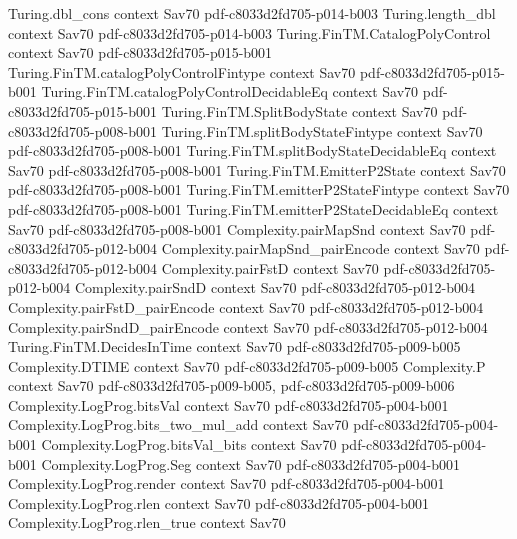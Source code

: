 \begin{theorem}
\proofstep
  {Turing.dbl_cons}
  {context}
  {Sav70}
  {pdf-c8033d2fd705-p014-b003}
\proofstep
  {Turing.length_dbl}
  {context}
  {Sav70}
  {pdf-c8033d2fd705-p014-b003}
\proofstep
  {Turing.FinTM.CatalogPolyControl}
  {context}
  {Sav70}
  {pdf-c8033d2fd705-p015-b001}
\proofstep
  {Turing.FinTM.catalogPolyControlFintype}
  {context}
  {Sav70}
  {pdf-c8033d2fd705-p015-b001}
\proofstep
  {Turing.FinTM.catalogPolyControlDecidableEq}
  {context}
  {Sav70}
  {pdf-c8033d2fd705-p015-b001}
\proofstep
  {Turing.FinTM.SplitBodyState}
  {context}
  {Sav70}
  {pdf-c8033d2fd705-p008-b001}
\proofstep
  {Turing.FinTM.splitBodyStateFintype}
  {context}
  {Sav70}
  {pdf-c8033d2fd705-p008-b001}
\proofstep
  {Turing.FinTM.splitBodyStateDecidableEq}
  {context}
  {Sav70}
  {pdf-c8033d2fd705-p008-b001}
\proofstep
  {Turing.FinTM.EmitterP2State}
  {context}
  {Sav70}
  {pdf-c8033d2fd705-p008-b001}
\proofstep
  {Turing.FinTM.emitterP2StateFintype}
  {context}
  {Sav70}
  {pdf-c8033d2fd705-p008-b001}
\proofstep
  {Turing.FinTM.emitterP2StateDecidableEq}
  {context}
  {Sav70}
  {pdf-c8033d2fd705-p008-b001}
\proofstep
  {Complexity.pairMapSnd}
  {context}
  {Sav70}
  {pdf-c8033d2fd705-p012-b004}
\proofstep
  {Complexity.pairMapSnd_pairEncode}
  {context}
  {Sav70}
  {pdf-c8033d2fd705-p012-b004}
\proofstep
  {Complexity.pairFstD}
  {context}
  {Sav70}
  {pdf-c8033d2fd705-p012-b004}
\proofstep
  {Complexity.pairSndD}
  {context}
  {Sav70}
  {pdf-c8033d2fd705-p012-b004}
\proofstep
  {Complexity.pairFstD_pairEncode}
  {context}
  {Sav70}
  {pdf-c8033d2fd705-p012-b004}
\proofstep
  {Complexity.pairSndD_pairEncode}
  {context}
  {Sav70}
  {pdf-c8033d2fd705-p012-b004}
\proofstep
  {Turing.FinTM.DecidesInTime}
  {context}
  {Sav70}
  {pdf-c8033d2fd705-p009-b005}
\proofstep
  {Complexity.DTIME}
  {context}
  {Sav70}
  {pdf-c8033d2fd705-p009-b005}
\proofstep
  {Complexity.P}
  {context}
  {Sav70}
  {pdf-c8033d2fd705-p009-b005,
    pdf-c8033d2fd705-p009-b006}
\proofstep
  {Complexity.LogProg.bitsVal}
  {context}
  {Sav70}
  {pdf-c8033d2fd705-p004-b001}
\proofstep
  {Complexity.LogProg.bits_two_mul_add}
  {context}
  {Sav70}
  {pdf-c8033d2fd705-p004-b001}
\proofstep
  {Complexity.LogProg.bitsVal_bits}
  {context}
  {Sav70}
  {pdf-c8033d2fd705-p004-b001}
\proofstep
  {Complexity.LogProg.Seg}
  {context}
  {Sav70}
  {pdf-c8033d2fd705-p004-b001}
\proofstep
  {Complexity.LogProg.render}
  {context}
  {Sav70}
  {pdf-c8033d2fd705-p004-b001}
\proofstep
  {Complexity.LogProg.rlen}
  {context}
  {Sav70}
  {pdf-c8033d2fd705-p004-b001}
\proofstep
  {Complexity.LogProg.rlen_true}
  {context}
  {Sav70}

\end{theorem}
